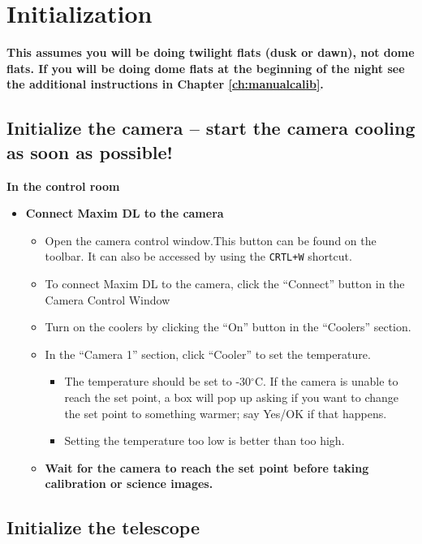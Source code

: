 \documentclass[letterpaper, 12pt]{report}
\begin{document}
\chapter{Initialization}\label{ch:initialization}
\textbf{This assumes you will be doing twilight flats (dusk or dawn), not dome flats. If you will be doing dome flats at the beginning of the night see the additional instructions in Chapter \ref{ch:manualcalib}.} \\

\section{Initialize the camera -- start the camera cooling as soon as possible!}

{\large \textbf{In the control room}}
\begin{itemize}
	\item \textbf{Connect Maxim DL to the camera}
	\begin{itemize}
		\item Open the camera control window.This button can be found on the toolbar. It can also be accessed by using the \texttt{CRTL+W} shortcut.
		\item To connect Maxim DL to the camera, click the ``Connect'' button in the Camera Control Window
		\item Turn on the coolers by clicking the ``On'' button in the ``Coolers'' section.
		\item In the ``Camera 1'' section, click ``Cooler'' to set the temperature.
		\begin{itemize}
			\item The temperature should be set to -30$^\circ$C. If the camera is unable to reach the set point, a box will pop up asking if you want to change the set point to something warmer; say Yes/OK if that happens.
			\item Setting the temperature too low is better than too high.
		\end{itemize}
		\item {\large \textbf{Wait for the camera to reach the set point before taking calibration or science images.}}
	\end{itemize}
\end{itemize}

\section{Initialize the telescope}
\end{document}
